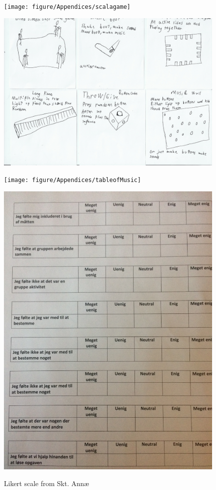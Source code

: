 \begin{figure}[H]
	\centering
	\texttt{[image: figure/Appendices/scalagame]}
	\label{fig:sketchOne}
	\caption{}
	
\end{figure}

\begin{figure}[H]
	\centering
	\includegraphics[width=0.7\linewidth]{figure/Appendices/sets}
	\label{fig:sets}
	\caption{}
	
\end{figure}

\begin{figure}[H]
	\centering
	\texttt{[image: figure/Appendices/tableofMusic]}
	\label{fig:tableofMusic}
	\caption{}
	
\end{figure}

\begin{figure}[H]
	\centering
	\includegraphics[width=0.7\linewidth]{figure/Appendices/likerts}
	\label{fig:likertScale}
	\caption{Likert scale from Skt. Annæ}
\end{figure}